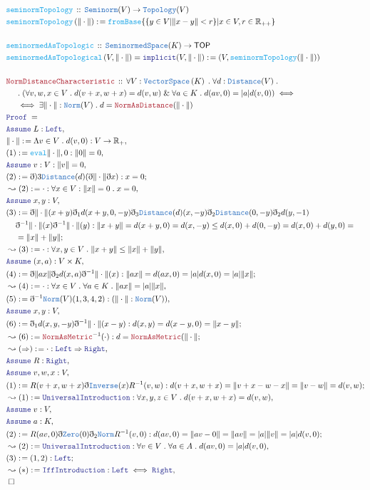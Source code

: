 \documentclass[12pt]{scrartcl}
\newcommand{\TYPE}[1]{\textcolor{NavyBlue}{\mathtt{#1}}}
\newcommand{\FUNC}[1]{\textcolor{Cerulean}{\mathtt{#1}}}
\newcommand{\LOGIC}[1]{\textcolor{Blue}{\mathtt{#1}}}
\newcommand{\THM}[1]{\textcolor{Maroon}{\mathtt{#1}}}
\renewcommand{\.}{\; . \;}
\newcommand{\de}{: \kern 0.1pc =}
\newcommand{\Act}[1]{\left( #1 \right)}
\newcommand{\Theorem}[2]{& \THM{#1} \, :: \, #2 \\ & \Proof = \\ }
\newcommand{\DeclareFunc}[2]{& \FUNC{#1} \, :: \, #2 \\}
\newcommand{\DefineFunc}[3]{&  \FUNC{#1}\Act{#2} \de #3 \\}
\newcommand{\DefineNamedFunc}[4]{&  \FUNC{#1}\Act{#2} = #3 \de #4 \\}
\newcommand{\NewLine}{\\ & \kern 1pc}
\newcommand{\Page}[1]{\begin{align*} #1 \end{align*} \newpage   }
\newcommand{ \bd }{ \ByDef }
\renewcommand{\And}{\; \& \;}
\newcommand{\Reals}{\mathbb{R} }
\newcommand{\Say}[3]{& #1 \de #2 : #3, \\}
\newcommand{\Conclude}[3]{& #1 \de #2 : #3; \\}
\newcommand{\Derive}[3]{& \leadsto #1 \de #2 : #3, \\}
\newcommand{\DeriveConclude}[3]{& \leadsto #1 \de #2 : #3 ; \\}
\newcommand{\A}{\LOGIC{Assume} \;}
\newcommand{\Assume}[2]{& \A #1 : #2, \\}
\newcommand{\QED}{\; \square}
\newcommand{\EndProof}{& \QED \\}
\newcommand{\ByDef}{\eth}
\newcommand{\Proof}{\LOGIC{Proof} \; }
\newcommand{\VS}[1]{\TYPE{VectorSpace}\left( #1 \right)}
\newcommand{\TOP}{ \mathsf{TOP}  }
\newcommand{\SNS}{\TYPE{SeminormedSpace}}
\begin{document}
\Page{
\DeclareFunc{seminormTopology}{ \TYPE{Seminorm}(V) \to \TYPE{Topology}(V) }
\DefineFunc{seminormTopology}{ \| \cdot \| }{ \FUNC{fromBase}\{ \{ y \in V | \| x - y \| < r \}     | x \in V, r \in \Reals_{++} \}  }
\\
\DeclareFunc{ seminormedAsTopologic }{ \SNS(K) \to \TOP }
\DefineNamedFunc{ seminormedAsTopological}{ V, \| \cdot \|   }{ \LOGIC{implicit}(V, \| \cdot \| ) }{ (V,\FUNC{seminormTopology}(\|\cdot\|) ) }
\\
\Theorem{ NormDistanceCharacteristic  }{ \forall V : \VS{K} \. \forall d : \TYPE{Distance}(V) \. \NewLine \. 
( \forall v,w,x \in V \. d(v + x,w + x) = d(v,w) \And \forall a \in K \. d(av,0) = |a| d(v,0)  ) \iff \NewLine \iff
  \exists \| \cdot \| : \TYPE{Norm}(V) \. d = \THM{NormAsDistance}(\| \cdot \|)
    }
\Assume{ L  }{\LOGIC{Left}}
\Say{ \| \cdot \|  }{ \Lambda  v \in V \. d(v,0)    }{V \to \Reals_+}
\Say{(1)}{ \FUNC{eval}{\| \cdot \|, 0} }{ \| 0 \| = 0 }
\Assume{v}{V : \| v \| = 0}
\Conclude{ (2)  }{ \ByDef)3 \TYPE{Distance}(d)(\ByDef\| \cdot \| \ByDef x)   }{x = 0}
\Derive{ (2) }{ \cdot }{\forall x \in V : \|x\| = 0 \. x = 0 }
\Assume{ x,y }{ V  } 
\Conclude{ (3)  }{ \bd \| \cdot \|( x + y) \bd_1 d(x +y,0, -y) \bd_3\TYPE{Distance}(d)(x,-y) 
\bd_2 \TYPE{Distance}(0, -y)  \bd_2 d( y, -1 )\NewLine\bd^{-1}\| \cdot \|(x) \bd^{-1} \| \cdot \| (y) 
}{
 \| x + y \| = d(x + y, 0) = d(x, - y) \le d(x, 0) + d(0, -y) = d(x,0) + d(y,0) = \NewLine = \|x \| + \| y \| }
\Derive{ (3) }{ \cdot}{ \forall x,y \in V \. \| x + y \| \le \| x \| + \| y \|}
\Assume{ (x,a) }{V \times K}
\Conclude{(4)}{  \ByDef \|  ax \| \ByDef_2  d (x, a) \ByDef^{-1} \| \cdot \|(x)    }{ \| ax \| = d(ax,0) = |a| d(x,0) = |a|\| x \| }
\Derive{(4)}{\cdot}{\forall x \in V \. \forall a \in K \. \| ax \| = |a| \| x \| }
\Say{(5)}{\ByDef^{-1}\TYPE{Norm}(V)(1,3,4,2)}{(\| \cdot \| : \TYPE{Norm}(V))}
\Assume{ x,y}{V}
\Conclude{ (6) }{ \bd_1 d(x,y,-y) \bd^{-1} \| \cdot \| ( x - y)   }{ d(x,y) = d(x - y,0) = \| x - y \| }
\DeriveConclude{(6)}{  \THM{NormAsMetric}^{-1}(\cdot)  }{ d = \THM{NormAsMetric}(\| \cdot \| }
\Derive{ (\Rightarrow)  }{\cdot}{ \LOGIC{Left} \Rightarrow \LOGIC{Right} }
\Assume{ R }{\LOGIC{Right}}
\Assume{v,w,x}{V}
\Conclude{(1)}{ R(v + x, w + x)\ByDef\TYPE{Inverse}(x) R^{-1}(v,w)  }{ d(v + x,w + x) = \| v + x - w - x \| = \| v  - w  \| = d(v,w)}
\Derive{(1)}{ \LOGIC{UniversalIntroduction}  }{ \forall x,y,z \in V \. d(v + x,w + x) = d(v,w)  }
\Assume{v}{V}
\Assume{a}{K}
\Conclude{(2)}{ R(av,0) \ByDef\TYPE{Zero}(0) \ByDef_2 \TYPE{Norm} R^{-1} ( v, 0  )    }{ d(av,0) = \| av - 0 \| = \| av \| = |a| \|v\| = |a|d(v,0)  }
\Derive{(2)}{\LOGIC{UniversalIntroduction}  }{ \forall v \in V \. \forall a \in A \. d(av,0) = |a|d(v,0)  }
\Conclude{(3)}{(1,2)}{\LOGIC{Left}}
\Derive{(*)}{ \LOGIC{IffIntroduction} }{ \LOGIC{Left} \iff \LOGIC{Right} }
\EndProof
}
\end{document}
